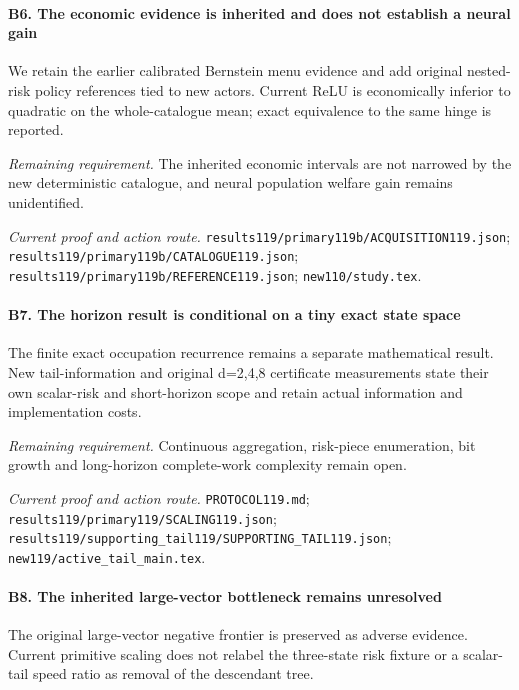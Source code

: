 \paragraph{B6. The economic evidence is inherited and does not establish a neural gain}

We retain the earlier calibrated Bernstein menu evidence and add original nested-risk policy references tied to new actors. Current ReLU is economically inferior to quadratic on the whole-catalogue mean; exact equivalence to the same hinge is reported.

\par\emph{Remaining requirement.} The inherited economic intervals are not narrowed by the new deterministic catalogue, and neural population welfare gain remains unidentified.

\par\emph{Current proof and action route.} \nolinkurl{results119/primary119b/ACQUISITION119.json}; \nolinkurl{results119/primary119b/CATALOGUE119.json}; \nolinkurl{results119/primary119b/REFERENCE119.json}; \nolinkurl{new110/study.tex}.

\paragraph{B7. The horizon result is conditional on a tiny exact state space}

The finite exact occupation recurrence remains a separate mathematical result. New tail-information and original d=2,4,8 certificate measurements state their own scalar-risk and short-horizon scope and retain actual information and implementation costs.

\par\emph{Remaining requirement.} Continuous aggregation, risk-piece enumeration, bit growth and long-horizon complete-work complexity remain open.

\par\emph{Current proof and action route.} \nolinkurl{PROTOCOL119.md}; \nolinkurl{results119/primary119/SCALING119.json}; \nolinkurl{results119/supporting_tail119/SUPPORTING_TAIL119.json}; \nolinkurl{new119/active_tail_main.tex}.

\paragraph{B8. The inherited large-vector bottleneck remains unresolved}

The original large-vector negative frontier is preserved as adverse evidence. Current primitive scaling does not relabel the three-state risk fixture or a scalar-tail speed ratio as removal of the descendant tree.

